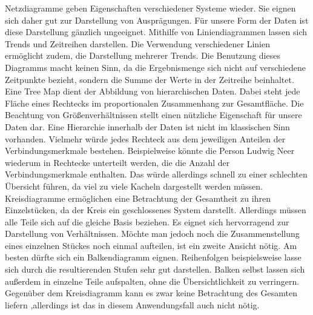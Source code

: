 Netzdiagramme geben Eigenschaften verschiedener Systeme wieder. Sie eignen sich daher gut zur Darstellung von Ausprägungen. Für unsere Form der Daten ist diese Darstellung gänzlich ungeeignet. Mithilfe von Liniendiagrammen lassen sich Trends und Zeitreihen darstellen. Die Verwendung verschiedener Linien ermöglicht zudem, die Darstellung mehrerer Trends. Die Benutzung dieses Diagramms macht keinen Sinn, da die Ergebnismenge sich nicht auf verschiedene Zeitpunkte bezieht, sondern die Summe der Werte in der Zeitreihe beinhaltet. Eine Tree Map dient der Abbildung von hierarchischen Daten. Dabei steht jede Fläche eines Rechtecks im proportionalen Zusammenhang zur Gesamtfläche. Die Beachtung von Größenverhältnissen stellt einen nützliche Eigenschaft für unsere Daten dar. Eine Hierarchie innerhalb der Daten ist nicht im klassischen Sinn vorhanden. Vielmehr würde jedes Rechteck aus dem jeweiligen Anteilen der Verbindungsmerkmale bestehen. Beispielweise könnte die Person Ludwig Neer wiederum in Rechtecke unterteilt werden, die die Anzahl der  Verbindungsmerkmale enthalten. Das würde allerdings schnell zu einer schlechten Übersicht führen, da viel zu viele Kacheln dargestellt werden müssen. Kreisdiagramme ermöglichen eine Betrachtung der Gesamtheit zu ihren Einzelstücken, da der Kreis ein geschlossenes System darstellt. Allerdings müssen alle Teile sich auf die gleiche Basis beziehen. Es eignet sich hervorragend zur Darstellung von Verhältnissen. Möchte man jedoch noch die Zusammenstellung eines einzelnen Stückes noch einmal aufteilen, ist ein zweite Ansicht nötig. Am besten dürfte sich ein Balkendiagramm eignen. Reihenfolgen beispielsweise lasse sich durch die resultierenden Stufen sehr gut darstellen. Balken selbst lassen sich außerdem in einzelne Teile aufspalten, ohne die Übersichtlichkeit zu verringern. Gegenüber dem Kreisdiagramm kann es zwar keine Betrachtung des Gesamten liefern ,allerdings ist das in diesem Anwendungsfall auch nicht nötig. 